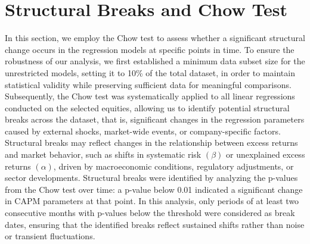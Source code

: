 \section{Structural Breaks and Chow Test}

In this section, we employ the Chow test to assess whether a significant structural change occurs in the regression models at 
specific points in time. 
To ensure the robustness of our analysis, we first established a minimum data subset size for the unrestricted models, 
setting it to 10\% of the total dataset, in order to maintain statistical validity while preserving sufficient data for
meaningful comparisons.
Subsequently, the Chow test was systematically applied to all linear regressions conducted on the selected equities, 
allowing us to identify potential structural breaks across the dataset, that is, significant changes in the regression
parameters caused by external shocks, market-wide events, or company-specific factors. 
Structural breaks may reflect changes in the relationship between excess returns and market behavior, such as shifts in 
systematic risk $(\beta)$ or unexplained excess returns $(\alpha)$, driven by macroeconomic conditions,
regulatory adjustments, or sector developments.
Structural breaks were identified by analyzing the p-values from the Chow test over time: a p-value below 0.01 indicated a
significant change in CAPM parameters at that point.
In this analysis, only periods of at least two consecutive months with p-values below the threshold were considered as
break dates, ensuring that the identified breaks reflect sustained shifts rather than noise or transient fluctuations.

